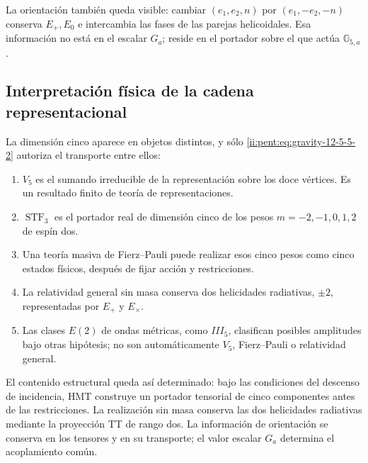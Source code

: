 La orientaci\'on tambi\'en queda visible: cambiar
\((e_1,e_2,n)\) por \((e_1,-e_2,-n)\) conserva \(E_+,E_0\) e intercambia
las fases de las parejas helicoidales. Esa informaci\'on no est\'a en el
escalar \(G_a\); reside en el portador sobre el que act\'ua
\(\mathbb G_{5,a}\).

\subsection{Interpretación física de la cadena representacional}

La dimensi\'on cinco aparece en objetos distintos, y s\'olo
\eqref{ii:pent:eq:gravity-12-5-5-2} autoriza el transporte entre ellos:

\begin{enumerate}
\item \(V_5\) es el sumando irreducible de la representaci\'on sobre los
doce v\'ertices. Es un resultado finito de teor\'ia de representaciones.
\item \(\operatorname{STF}_3\) es el portador real de dimensi\'on cinco de
los pesos \(m=-2,-1,0,1,2\) de esp\'in dos.
\item Una teor\'ia masiva de Fierz--Pauli puede realizar esos cinco pesos
como cinco estados f\'isicos, despu\'es de fijar acci\'on y restricciones.
\item La relatividad general sin masa conserva dos helicidades radiativas,
\(\pm2\), representadas por \(E_+\) y \(E_\times\).
\item Las clases \(E(2)\) de ondas m\'etricas, como \(III_5\), clasifican
posibles amplitudes bajo otras hip\'otesis; no son autom\'aticamente
\(V_5\), Fierz--Pauli o relatividad general.
\end{enumerate}

El contenido estructural queda así determinado: bajo las condiciones del
descenso de incidencia, HMT construye un portador tensorial de cinco
componentes antes de las restricciones. La realización sin masa conserva
las dos helicidades radiativas mediante la proyección TT de rango dos.
La información de orientación se conserva en los tensores y en su
transporte; el valor escalar \(G_a\) determina el acoplamiento común.
